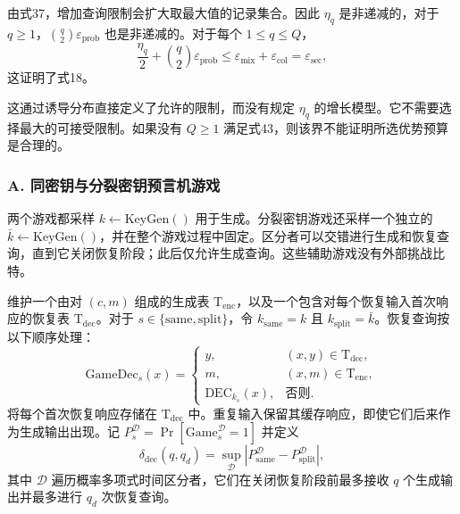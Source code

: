由式37，增加查询限制会扩大取最大值的记录集合。因此 \(\eta_q\) 是非递减的，对于 \(q \ge 1\)，\(\binom{q}{2} \varepsilon_{\mathrm{prob}}\) 也是非递减的。对于每个 \(1 \le q \le Q\)，
\begin{equation}
\frac{\eta_q}{2} + \binom{q}{2} \varepsilon_{\mathrm{prob}} \le \varepsilon_{\mathrm{mix}} + \varepsilon_{\mathrm{col}} = \varepsilon_{\mathrm{sec}}, \tag{44}
\end{equation}
这证明了式18。

这通过诱导分布直接定义了允许的限制，而没有规定 \(\eta_q\) 的增长模型。它不需要选择最大的可接受限制。如果没有 \(Q \ge 1\) 满足式43，则该界不能证明所选优势预算是合理的。


\subsubsection*{A. 同密钥与分裂密钥预言机游戏}

两个游戏都采样 \(k \leftarrow \mathrm{KeyGen}()\) 用于生成。分裂密钥游戏还采样一个独立的 \(\bar{k} \leftarrow \mathrm{KeyGen}()\)，并在整个游戏过程中固定。区分者可以交错进行生成和恢复查询，直到它关闭恢复阶段；此后仅允许生成查询。这些辅助游戏没有外部挑战比特。

维护一个由对 \((c, m)\) 组成的生成表 \(\mathrm{T}_{\mathrm{enc}}\)，以及一个包含对每个恢复输入首次响应的恢复表 \(\mathrm{T}_{\mathrm{dec}}\)。对于 \(s \in \{\mathrm{same}, \mathrm{split}\}\)，令 \(k_{\mathrm{same}} = k\) 且 \(k_{\mathrm{split}} = \bar{k}\)。恢复查询按以下顺序处理：
\begin{equation}
\mathrm{GameDec}_s(x) = 
\begin{cases}
y, & (x, y) \in \mathrm{T}_{\mathrm{dec}}, \\
m, & (x, m) \in \mathrm{T}_{\mathrm{enc}}, \\
\mathrm{DEC}_{k_s}(x), & \text{否则}.
\end{cases} \tag{45}
\end{equation}
将每个首次恢复响应存储在 \(\mathrm{T}_{\mathrm{dec}}\) 中。重复输入保留其缓存响应，即使它们后来作为生成输出出现。记 \(P_s^{\mathcal{D}} = \Pr[\mathrm{Game}_s^{\mathcal{D}} = 1]\) 并定义
\begin{equation}
\delta_{\mathrm{dec}}(q, q_d) = \sup_{\mathcal{D}} \left| P_{\mathrm{same}}^{\mathcal{D}} - P_{\mathrm{split}}^{\mathcal{D}} \right|, \tag{46}
\end{equation}
其中 \(\mathcal{D}\) 遍历概率多项式时间区分者，它们在关闭恢复阶段前最多接收 \(q\) 个生成输出并最多进行 \(q_d\) 次恢复查询。

